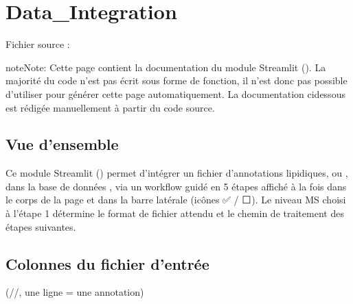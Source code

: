 \documentclass[letterpaper,10pt,english]{sphinxmanual}
\begin{document}
\sphinxstepscope


\chapter{Data\_Integration}
\label{\detokenize{1_Integration:data-integration}}\label{\detokenize{1_Integration::doc}}
\sphinxAtStartPar
Fichier source : 

\begin{sphinxadmonition}{note}{Note:}
\sphinxAtStartPar
Cette page contient la documentation du module Streamlit ().
La majorité du code n’est pas écrit sous forme de fonction, il n’est donc pas possible d’utiliser 
pour générer cette page automatiquement. La documentation ci\sphinxhyphen{}dessous est rédigée manuellement
à partir du code source.
\end{sphinxadmonition}


\section{Vue d’ensemble}
\label{\detokenize{1_Integration:vue-d-ensemble}}
\sphinxAtStartPar
Ce module Streamlit () permet d’intégrer un fichier d’annotations
lipidiques,  ou , dans la base de données , via un
workflow guidé en 5 étapes affiché à la fois dans le corps de la page et dans
la barre latérale (icônes ✅ / ⬜). Le niveau MS choisi à l’étape 1 détermine
le format de fichier attendu et le chemin de traitement des étapes suivantes.


\section{Colonnes du fichier d’entrée}
\label{\detokenize{1_Integration:colonnes-du-fichier-d-entree}}
\sphinxAtStartPar
{} (//, une ligne = une annotation)
\end{document}
